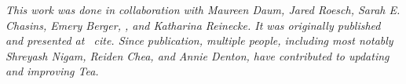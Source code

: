 \begin{comment}
4-5 sentences: 
1. Restate problem 
2. Articulate core contributions: problem/idea + technical
3. Key Evaluation results
4. 1 soundbite/takeaway
5. Transition to next chapter. 

1. Restate problem 

A common approach to assessing support for conceptual hypotheses in data is to
use statistical tests (e.g., Student's t-test, Chi-Square test, ANOVA).
Statistical testing requires analysts to grapple with their conceptual
hypotheses, know a number of tests and when they are applicable (i.e., know the
preconditions for when these tests hold), assess the applicability of tests
(i.e., check preconditions), and pick and implement specific tests using
low-level APIs. 

2. Articulate core contributions: problem/idea + technical

Tea's key insight is that we can reformulate statistical test selection as a
constraint satisfaction problem. We designed and implemented a higher-level DSL
around this insight that takes an analyst's hypothesis and assumptions about
their data as input and provides the results of executing valid statistical
tests as output. 

3. Key Evaluation results

In an evaluation, we found that Tea avoids faulty test
selection and conclusions that are easy to make using existing tools.

4. 1 soundbite/takeaway 

It is possible to design higher level language and automated reasoning to select
valid statistical tests that are widely used and even avoid faulty conclusions
that are easy to make using existing tools. The key is to make implicit
assumptions about the data explicit and reason about analyst assumptions and
computed data properties together in a logical constraint system. 

5. Transition to next chapter. 

However, an important limitation to overcome in the future chapters, most
notably in Tisane (~\autoref{chapter:tisane}) is how to generalize automated
support for more complex research questions and statistical analyses. 

Tea demonstrates the feasibility and benefit of developing systems that
emphasize \textit{higher-level abstractions} and \textit{automated reasoning}
for statistical tests (\autoref{para:thesisStatement}). Next, we consider how
this approach generalizes to a larger class of statistical analyses. could
\end{comment}

\textit{This work was done in collaboration with Maureen Daum, Jared Roesch, Sarah E.
Chasins, Emery Berger, \reneJust, and Katharina Reinecke. It was originally
published and presented at ~cite{}. Since publication, multiple
people, including most notably Shreyash Nigam, Reiden Chea, and Annie Denton,
have contributed to updating and improving Tea.}
